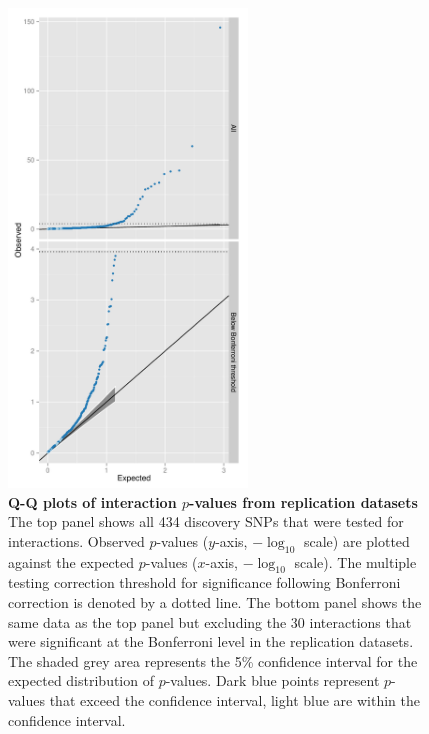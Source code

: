 \documentclass{article}
\begin{document}
\begin{figure}[H]
	\centering
	\includegraphics[width=2.5in]{qqMeta.pdf}
	\caption{\textbf{Q-Q plots of interaction $p$-values from replication datasets} The top panel shows all 434 discovery SNPs that were tested for interactions. Observed $p$-values ($y$-axis, $-\log_{10}$ scale) are plotted against the expected $p$-values ($x$-axis, $-\log_{10}$ scale). The multiple testing correction threshold for significance following Bonferroni correction is denoted by a dotted line. The bottom panel shows the same data as the top panel but excluding the 30 interactions that were significant at the Bonferroni level in the replication datasets. The shaded grey area represents the 5\% confidence interval for the expected distribution of $p$-values. Dark blue points represent $p$-values that exceed the confidence interval, light blue are within the confidence interval.}
	\label{fig:qqMeta}
\end{figure}
\end{document}
